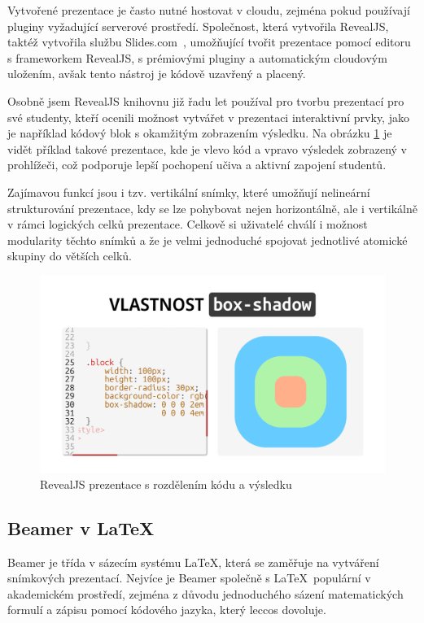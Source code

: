 Vytvořené prezentace je často nutné hostovat v cloudu, zejména pokud používají pluginy vyžadující serverové prostředí.
Společnost, která vytvořila RevealJS, taktéž vytvořila službu Slides.com~\cite{revealjs, slidescom}, umožňující tvořit prezentace pomocí editoru s frameworkem RevealJS, s prémiovými pluginy a automatickým cloudovým uložením, avšak tento nástroj je kódově uzavřený a placený. 

Osobně jsem RevealJS knihovnu již řadu let používal pro tvorbu prezentací pro své studenty, kteří ocenili možnost vytvářet v prezentaci interaktivní prvky, jako je například kódový blok s okamžitým zobrazením výsledku. 
Na obrázku \ref{fig:analyza:revealjs-ukazka} je vidět příklad takové prezentace, kde je vlevo kód a vpravo výsledek zobrazený v prohlížeči, což podporuje lepší pochopení učiva a aktivní zapojení studentů. 

Zajímavou funkcí jsou i tzv. vertikální snímky, které umožňují nelineární strukturování prezentace, kdy se lze pohybovat nejen horizontálně, ale i vertikálně v rámci logických celků prezentace.
Celkově si uživatelé chválí i možnost modularity těchto snímků a že je velmi jednoduché spojovat jednotlivé atomické skupiny do větších celků.


\begin{figure}[h!]
    \centering
    \includegraphics[width=0.9\linewidth]{media/03_analyza/revealjs.png}
    \caption{RevealJS prezentace s rozdělením kódu a výsledku}
    \label{fig:analyza:revealjs-ukazka}
\end{figure}

\subsection{Beamer v \LaTeX}

Beamer je třída v sázecím systému \LaTeX, která se zaměřuje na vytváření snímkových prezentací.
Nejvíce je Beamer společně s \LaTeX~populární v akademickém prostředí, zejména z důvodu jednoduchého sázení matematických formulí a zápisu pomocí kódového jazyka, který leccos dovoluje. 

